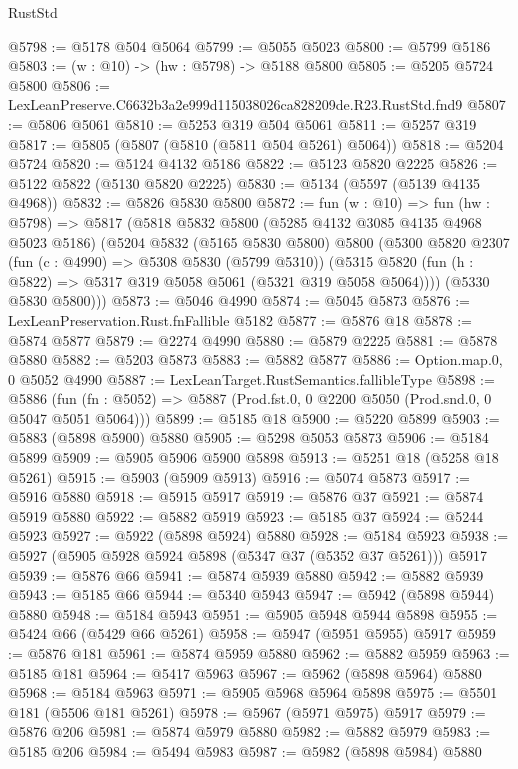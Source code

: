 \begin{lexlean}{RustStd}
\begin{coremodule}
@5798 := @5178 @504 @5064
@5799 := @5055 @5023
@5800 := @5799 @5186
@5803 := (w : @10) -> (hw : @5798) -> @5188 @5800
@5805 := @5205 @5724 @5800
@5806 := LexLeanPreserve.C6632b3a2e999d115038026ca828209de.R23.RustStd.fnd9
@5807 := @5806 @5061
@5810 := @5253 @319 @504 @5061
@5811 := @5257 @319
@5817 := @5805 (@5807 (@5810 (@5811 @504 @5261) @5064))
@5818 := @5204 @5724
@5820 := @5124 @4132 @5186
@5822 := @5123 @5820 @2225
@5826 := @5122 @5822 (@5130 @5820 @2225)
@5830 := @5134 (@5597 (@5139 @4135 @4968))
@5832 := @5826 @5830 @5800
@5872 := fun (w : @10) =>
  fun (hw : @5798) =>
  @5817
    (@5818
      @5832
      @5800
      (@5285 @4132 @3085 @4135 @4968 @5023 @5186)
      (@5204
        @5832
        (@5165 @5830 @5800)
        @5800
        (@5300
          @5820
          @2307
          (fun (c : @4990) => @5308 @5830 (@5799 @5310))
          (@5315 @5820 (fun (h : @5822) => @5317 @319 @5058 @5061 (@5321 @319 @5058 @5064))))
        (@5330 @5830 @5800)))
@5873 := @5046 @4990
@5874 := @5045 @5873
@5876 := LexLeanPreservation.Rust.fnFallible @5182
@5877 := @5876 @18
@5878 := @5874 @5877
@5879 := @2274 @4990
@5880 := @5879 @2225
@5881 := @5878 @5880
@5882 := @5203 @5873
@5883 := @5882 @5877
@5886 := Option.map.{0, 0} @5052 @4990
@5887 := LexLeanTarget.RustSemantics.fallibleType
@5898 := @5886
    (fun (fn : @5052) => @5887 (Prod.fst.{0, 0} @2200 @5050 (Prod.snd.{0, 0} @5047 @5051 @5064)))
@5899 := @5185 @18
@5900 := @5220 @5899
@5903 := @5883 (@5898 @5900) @5880
@5905 := @5298 @5053 @5873
@5906 := @5184 @5899
@5909 := @5905 @5906 @5900 @5898
@5913 := @5251 @18 (@5258 @18 @5261)
@5915 := @5903 (@5909 @5913)
@5916 := @5074 @5873
@5917 := @5916 @5880
@5918 := @5915 @5917
@5919 := @5876 @37
@5921 := @5874 @5919 @5880
@5922 := @5882 @5919
@5923 := @5185 @37
@5924 := @5244 @5923
@5927 := @5922 (@5898 @5924) @5880
@5928 := @5184 @5923
@5938 := @5927 (@5905 @5928 @5924 @5898 (@5347 @37 (@5352 @37 @5261))) @5917
@5939 := @5876 @66
@5941 := @5874 @5939 @5880
@5942 := @5882 @5939
@5943 := @5185 @66
@5944 := @5340 @5943
@5947 := @5942 (@5898 @5944) @5880
@5948 := @5184 @5943
@5951 := @5905 @5948 @5944 @5898
@5955 := @5424 @66 (@5429 @66 @5261)
@5958 := @5947 (@5951 @5955) @5917
@5959 := @5876 @181
@5961 := @5874 @5959 @5880
@5962 := @5882 @5959
@5963 := @5185 @181
@5964 := @5417 @5963
@5967 := @5962 (@5898 @5964) @5880
@5968 := @5184 @5963
@5971 := @5905 @5968 @5964 @5898
@5975 := @5501 @181 (@5506 @181 @5261)
@5978 := @5967 (@5971 @5975) @5917
@5979 := @5876 @206
@5981 := @5874 @5979 @5880
@5982 := @5882 @5979
@5983 := @5185 @206
@5984 := @5494 @5983
@5987 := @5982 (@5898 @5984) @5880

\end{coremodule}
\end{lexlean}
